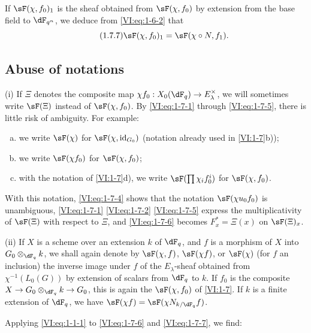 If $\sF(\chi,f_0)_1$ is the sheaf obtained from $\sF(\chi,f_0)$ by extension 
from the base field to $\dF_{q^n}$, we deduce from \eqref{VI:eq:1-6-2} that 
\begin{equation*}\tag{1.7.7}\label{VI:eq:1-7-7}
  \sF(\chi,f_0)_1 = \sF(\chi\circ N,f_1) \text{.}
\end{equation*}





\subsection{Abuse of notations}\label{VI:1-8}

(i) If $\Xi$ denotes the composite map 
$\chi f_0:X_0(\dF_q) \to E_\lambda^\times$, we will sometimes write $\sF(\Xi)$ 
instead of $\sF(\chi,f_0)$. By \eqref{VI:eq:1-7-1} through \eqref{VI:eq:1-7-5}, 
there is little risk of ambiguity. For example:
\begin{enumerate}[a)]
  \item we write $\sF(\chi)$ for $\sF(\chi,\operatorname{id}_{G_0})$ 
    (notation already used in \ref{VI:1-7}b)); 
  \item we write $\sF(\chi f_0)$ for $\sF(\chi,f_0)$;
  \item with the notation of \ref{VI:1-7}d), we write 
    $\sF(\prod \chi_i f_0^i)$ for $\sF(\chi,f_0)$. 
\end{enumerate}

With this notation, \eqref{VI:eq:1-7-4} shows that the notation 
$\sF(\chi u_0 f_0)$ is unambiguous, \eqref{VI:eq:1-7-1} \eqref{VI:eq:1-7-2} 
\eqref{VI:eq:1-7-5} express the multiplicativity of $\sF(\Xi)$ with respect to $\Xi$, 
and \eqref{VI:eq:1-7-6} becomes $F_x^\ast = \Xi(x)$ on $\sF(\Xi)_x$.

(ii) If $X$ is a scheme over an extension $k$ of $\dF_q$, and $f$ is a 
morphism of $X$ into $G_0\otimes_{\dF_q} k$, we shall again denote by $\sF(\chi,f)$, 
$\sF(\chi f)$, or $\sF(\chi)$ (for $f$ an inclusion) the inverse image under 
$f$ of the $E_\lambda$-sheaf obtained from $\chi^{-1}(L_0(G))$ by extension of 
scalars from $\dF_q$ to $k$. If $f_0$ is the composite 
$X\to G_0\otimes_{\dF_q} k \to G_0$, this is again the $\sF(\chi,f_0)$ of 
\ref{VI:1-7}. If $k$ is a finite extension of $\dF_q$, we have 
$\sF(\chi f) = \sF(\chi N_{k/\dF_q} f)$. 

Applying \eqref{VI:eq:1-1-1} to \eqref{VI:eq:1-7-6} and \eqref{VI:eq:1-7-7}, 
we find: 





